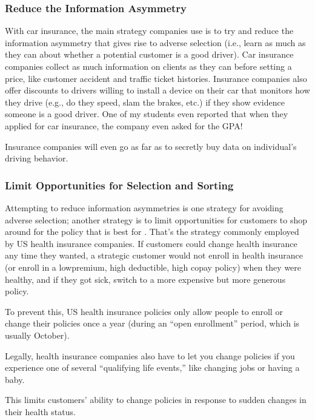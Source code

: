 \documentclass[letterpaper,10pt,english]{jupyterBook}
\begin{document}
\subsubsection{Reduce the Information Asymmetry}
\label{\detokenize{30_questions/29_passive_external_adversarial_users_examples:reduce-the-information-asymmetry}}
\sphinxAtStartPar
With car insurance, the main strategy companies use is to try and reduce the information asymmetry that gives rise to adverse selection (i.e., learn as much as they can about whether a potential customer is a good driver). Car insurance companies collect as much information on clients as they can before setting a price, like customer accident and traffic ticket histories. Insurance companies also offer discounts to drivers willing to install a device on their car that monitors how they drive (e.g., do they speed, slam the brakes, etc.) if they show evidence someone is a good driver. One of my students even reported that when they applied for car insurance, the company even asked for the GPA!

\sphinxAtStartPar
Insurance companies will even go as far as to secretly buy data  on individual’s driving behavior.


\subsubsection{Limit Opportunities for Selection and Sorting}
\label{\detokenize{30_questions/29_passive_external_adversarial_users_examples:limit-opportunities-for-selection-and-sorting}}
\sphinxAtStartPar
Attempting to reduce information asymmetries is one strategy for avoiding adverse selection; another strategy is to limit opportunities for customers to shop around for the policy that is best for . That’s the strategy commonly employed by US health insurance companies. If customers could change health insurance any time they wanted, a strategic customer would not enroll in health insurance (or enroll in a low\sphinxhyphen{}premium, high deductible, high co\sphinxhyphen{}pay policy) when they were healthy, and if they got sick, switch to a more expensive but more generous policy.

\sphinxAtStartPar
To prevent this, US health insurance policies only allow people to enroll or change their policies once a year (during an “open enrollment” period, which is usually October).%
\begin{footnote}[2]\sphinxAtStartFootnote
Legally, health insurance companies also have to let you change policies if you experience one of several “qualifying life events,” like changing jobs or having a baby.
%
\end{footnote} This limits customers’ ability to change policies in response to sudden changes in their health status.
\end{document}
